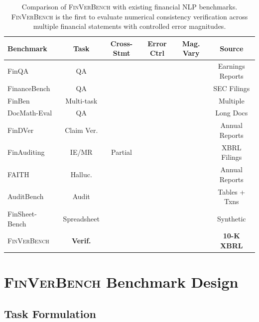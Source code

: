 \documentclass[11pt]{article}
\newcommand{\cmark}{\ding{51}}
\newcommand{\xmark}{\ding{55}}
\newcommand{\benchmark}{\textsc{FinVerBench}}
\begin{document}
\begin{table}[t]
\centering
\small
\caption{Comparison of \benchmark{} with existing financial NLP benchmarks. \benchmark{} is the first to evaluate numerical consistency verification across multiple financial statements with controlled error magnitudes.}
\label{tab:benchmark_comparison}
\begin{tabular}{lccccc}
\toprule
\textbf{Benchmark} & \textbf{Task} & \textbf{Cross-Stmt} & \textbf{Error Ctrl} & \textbf{Mag. Vary} & \textbf{Source} \\
\midrule
FinQA~\citeyearpar{chen2021finqa} & QA & \xmark & \xmark & \xmark & Earnings Reports \\
FinanceBench~\citeyearpar{islam2023financebench} & QA & \xmark & \xmark & \xmark & SEC Filings \\
FinBen~\citeyearpar{xie2024finben} & Multi-task & \xmark & \xmark & \xmark & Multiple \\
DocMath-Eval~\citeyearpar{zhao2024docmatheval} & QA & \xmark & \xmark & \xmark & Long Docs \\
FinDVer~\citeyearpar{wei2024findver} & Claim Ver. & \xmark & \xmark & \xmark & Annual Reports \\
FinAuditing~\citeyearpar{wang2025finauditing} & IE/MR & Partial & \xmark & \xmark & XBRL Filings \\
FAITH~\citeyearpar{zhang2025faith} & Halluc. & \xmark & \xmark & \xmark & Annual Reports \\
AuditBench~\citeyearpar{wang2025auditbench} & Audit & \xmark & \cmark & \xmark & Tables + Txns \\
FinSheet-Bench~\citeyearpar{finsheetbench2026} & Spreadsheet & \xmark & \xmark & \xmark & Synthetic \\
\midrule
\benchmark{} & \textbf{Verif.} & \cmark & \cmark & \cmark & \textbf{10-K XBRL} \\
\bottomrule
\end{tabular}
\end{table}

\section{\benchmark{} Benchmark Design}
\label{sec:benchmark}

\subsection{Task Formulation}
\label{sec:task}
\end{document}
